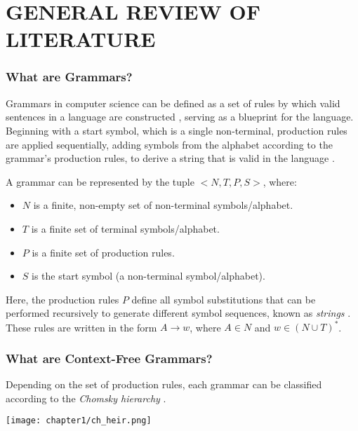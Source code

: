 \chapter{GENERAL REVIEW OF LITERATURE}

\subsection{What are Grammars?}

Grammars in computer science can be defined as a set of rules by which valid sentences in a language are constructed \cite{jiangFormalGrammarsLanguages}, serving as a blueprint for the language. Beginning with a start symbol, which is a single non-terminal, production rules are applied sequentially, adding symbols from the alphabet according to the grammar’s production rules, to derive a string that is valid in the language \cite{GrammarTheoryComputation2025}.

\vspace{\baselineskip}

A grammar can be represented by the tuple $<N, T, P, S>$, where:
\begin{itemize}
\item $N$ is a finite, non-empty set of non-terminal symbols/alphabet.
\item $T$ is a finite set of terminal symbols/alphabet.
\item $P$ is a finite set of production rules.
\item $S$ is the start symbol (a non-terminal symbol/alphabet).
\end{itemize}

Here, the production rules $P$ define all symbol substitutions that can be performed recursively to generate different symbol sequences, known as \emph{strings} \cite{GrammarTheoryComputation2025}. These rules are written in the form $A \rightarrow w$, where $A \in N$ and $w \in (N \cup T)^*$.

\subsection{What are Context-Free Grammars?}

Depending on the set of production rules, each grammar can be classified according to the \emph{Chomsky hierarchy} \cite{chomskyTHREEMODELSTIE1956}.

\begin{center}
    \texttt{[image: chapter1/ch\_heir.png]}
    \label{fig:hierarchy}
\end{center}

